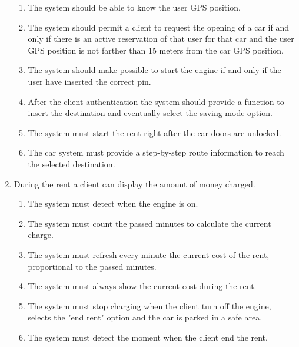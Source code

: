 \begin{enumerate}
\begin{enumerate}
\item The system should be able to know the user GPS position.
\item The system should permit a client to request the opening of a car if and only if there is an active reservation of that user for that car and the user GPS position is not farther than 15 meters from the car GPS position.
\item The system should make possible to start the engine if and only if the user have inserted the correct pin.
\item After the client authentication the system should provide a function to insert the destination and eventually select the saving mode option.
\item The system must start the rent right after the car doors are unlocked.
\item The car system must provide a step-by-step route information to reach the selected destination.
\end{enumerate}

\item During the rent a client can display the amount of money charged.
\begin{enumerate}
\item The system must detect when the engine is on.
\item The system must count the passed minutes to calculate the current charge.
\item The system must refresh every minute the current cost of the rent, proportional to the passed minutes.
\item The system must always show the current cost during the rent.
\item The system must stop charging when the client turn off the engine, selects the "end rent" option and the car is parked in a safe area.
\item The system must detect the moment when the client end the rent.
\end{enumerate}


\end{enumerate}
